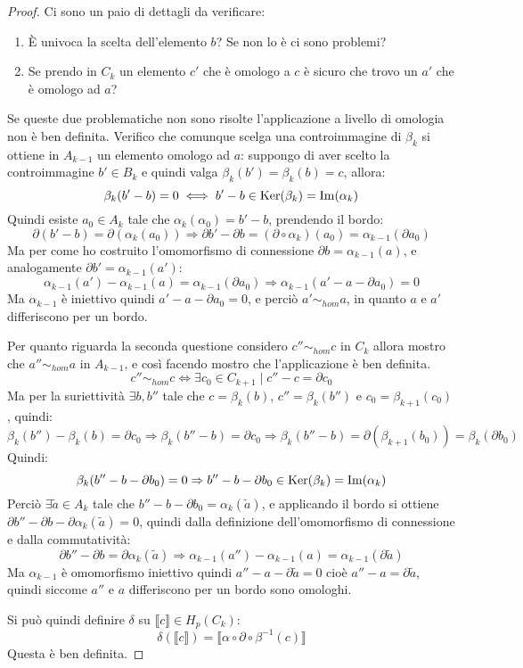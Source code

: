 \begin{proof}
  Ci sono un paio di dettagli da verificare:
  \begin{enumerate}
  \item È univoca la scelta dell'elemento $ b $? Se non lo è ci sono
    problemi?
  \item Se prendo in $ C_k $ un elemento $ c' $ che è omologo
    a $ c $ è sicuro che trovo un $ a' $ che è
    omologo ad $ a $?
  \end{enumerate}
  Se queste due problematiche non sono risolte l'applicazione a livello di
  omologia non è ben definita. Verifico che comunque scelga una controimmagine
  di $ \beta_k $ si ottiene in $ A_{k-1} $ un elemento omologo ad $ a $: suppongo di
  aver scelto la controimmagine $ b' \in B_k $ e quindi valga
  $ \beta_k (b') = \beta_k (b) = c $, allora:
  \[
    \beta_k(b' - b) = 0 \iff b' - b \in \mathrm{Ker}( \beta_k) = \mathrm{Im}( \alpha_k )
  \]
  Quindi esiste $ a_0 \in A_k $ tale che $ \alpha_k(\alpha_0) = b' - b $, prendendo
  il bordo:
  \[
    \partial ( b' - b ) = \partial ( \alpha_k (a_0 )) \Rightarrow \partial b' - \partial b = (\partial \circ \alpha_k)(a_0) = \alpha_{k-1}(\partial a_0)
  \]
  Ma per come ho costruito l'omomorfismo di connessione $ \partial b = \alpha_{k-1}(a) $,
  e analogamente $ \partial b' = \alpha_{k-1}(a') $:
  \[
    \alpha_{k-1}(a') - \alpha_{k-1}(a) = \alpha_{k-1}(\partial a_0) \Rightarrow \alpha_{k-1}(a' - a - \partial a_0) = 0
  \]
  Ma $ \alpha_{k-1} $ è iniettivo quindi $ a' - a - \partial a_0 = 0 $, e perciò  $ a' \sim_{hom} a $,
  in quanto $ a $ e $ a' $ differiscono per un bordo.

  Per quanto riguarda la seconda questione considero $ c'' \sim_{hom} c $ in $ C_k $
  allora mostro che $ a'' \sim_{hom} a $ in $ A_{k-1} $, e così facendo
  mostro che l'applicazione è ben definita.
  \[
    c'' \sim_{hom} c \iff \exists c_0 \in C_{k+1} \; | \; c'' - c = \partial c_0
  \]
  Ma per la suriettività $ \exists b, b'' $ tale che $ c = \beta_k(b) $,
  $ c'' = \beta_k(b'') $ e $ c_0 = \beta_{k+1}(c_0) $, quindi:
  \[
    \beta_k(b'') - \beta_k(b) = \partial c_0 \Rightarrow \beta_k(b'' - b) = \partial c_0  \Rightarrow
    \beta_k(b''-b) = \partial\left( \beta_{k+1}(b_0)\right) = \beta_{k}(\partial b_0)
  \]
  Quindi:
  \[
    \beta_k(b'' - b - \partial b_0) = 0 \Rightarrow b'' - b - \partial b_0 \in \mathrm{Ker}( \beta_k) = \mathrm{Im}( \alpha_k )
  \]
  Perciò $ \exists \tilde{a} \in A_k$ tale che $ b'' - b - \partial b_0 = \alpha_k (\tilde{a}) $, e
  applicando il bordo si ottiene $ \partial b'' - \partial b - \partial \alpha_k(\tilde{a}) = 0 $, quindi
  dalla definizione dell'omomorfismo di connessione e dalla commutatività:
  \[
    \partial b'' - \partial b = \partial \alpha_{k}(\tilde{a}) \Rightarrow \alpha_{k-1}(a'') - \alpha_{k-1}(a) = \alpha_{k-1}(\partial \tilde{a})
  \]
  Ma $ \alpha_{k-1} $ è omomorfismo iniettivo quindi
  $ a'' - a - \partial \tilde{a} = 0 $ cioè $ a'' - a = \partial \tilde{a} $,
  quindi siccome $ a'' $ e $ a $ differiscono per un bordo sono omologhi.

  Si può quindi definire $ \delta $ su $ \llbracket c \rrbracket \in H_p(C_k) $:
  \[
    \delta(\llbracket c \rrbracket) = \llbracket \alpha \circ \partial \circ \beta^{-1}(c) \rrbracket
  \]
  Questa è ben definita.
\end{proof}

